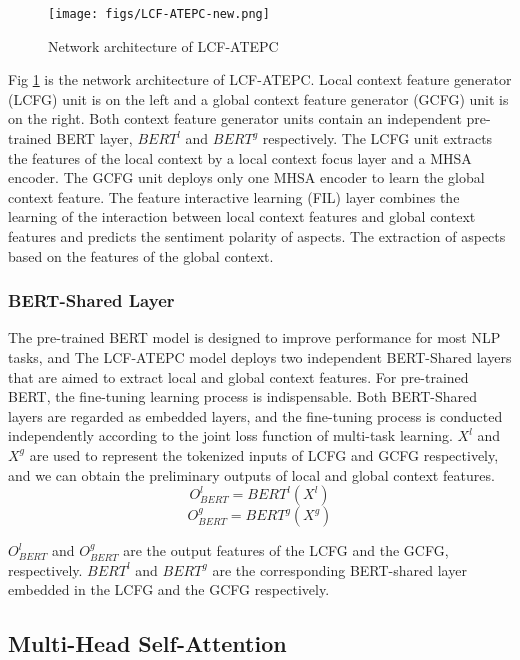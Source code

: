 \documentclass[a4paper,fleqn]{cas-sc}
\begin{document}
\begin{figure}
	\centering
	\texttt{[image: figs/LCF-ATEPC-new.png]}
	\caption{Network architecture of LCF-ATEPC}
	\label{fig:lcf-atepc}
\end{figure}

Fig \ref{fig:lcf-atepc} is the network architecture of LCF-ATEPC. 
Local context feature generator (LCFG) unit is on the left and a global context feature generator (GCFG) unit is on the right. Both context feature generator units contain an independent pre-trained BERT layer, $BERT^l$ and $BERT^g$ respectively. The LCFG unit extracts the features of the local context by a local context focus layer and a MHSA encoder. The GCFG unit deploys only one MHSA encoder to learn the global context feature. The feature interactive learning (FIL) layer combines the learning of the interaction between local context features and global context features and predicts the sentiment polarity of aspects. The extraction of aspects based on the features of the global context. 

\subsubsection{BERT-Shared Layer}

The pre-trained BERT model is designed to improve performance for most NLP tasks, and The LCF-ATEPC model deploys two independent BERT-Shared layers that are aimed to extract local and global context features. 
For pre-trained BERT, the fine-tuning learning process is indispensable. Both BERT-Shared layers are regarded as embedded layers, and the fine-tuning process is conducted independently according to the joint loss function of multi-task learning.
$X^{l}$ and $X^{g}$ are used to represent the tokenized inputs of LCFG and GCFG respectively, and we can obtain the preliminary outputs of local and global context features.
\begin{equation}
O^{l}_{BERT}=B E R T^{l}\left(X^{l}\right)
\end{equation}
\begin{equation}
O^{g}_{BERT}=B E R T^{g}\left(X^{g}\right)
\end{equation}

$O^{l}_{BERT}$ and $O^{g}_{BERT}$ are the output features of the LCFG and the GCFG, respectively. $BERT^{l}$ and $BERT^{g}$ are the corresponding BERT-shared layer embedded in the LCFG and the GCFG respectively.

\subsection{Multi-Head Self-Attention}
\end{document}
